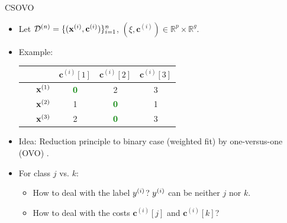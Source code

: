 \documentclass[11pt,compress,t,notes=noshow, xcolor=table]{beamer}
\newcommand{\cv}{\mathbf{c}}
\begin{document}
\begin{frame}{CSOVO}

    \begin{itemize}
        \item Let $\D^{(n)} = \{(\xi, \cv^{(i)})\}_{i=1}^n$, $(\xi, \cv^{(i)}) \in \mathbb{R}^p \times \mathbb{R}^g$.
        \item Example:

        \begin{center}
            \begin{tabular}{cc|ccc}\
        	& & $\cv^{(i)}[1]$ & $\cv^{(i)}[2]$ & $\cv^{(i)}[3]$  \\
        	\hline & $\mathbf{x}^{(1)}$ & \textcolor{green}{\textbf{0}} & 2 & 3\\
        	& $\mathbf{x}^{(2)}$ & 1 & \textcolor{green}{\textbf{0}} & 1\\
                 & $\mathbf{x}^{(3)}$ & 2 & \textcolor{green}{\textbf{0}} & 3\\
            \end{tabular}
        \end{center}
        
        
        \item Idea: Reduction principle to binary case (weighted fit) by one-versus-one (OVO) . 
        
        
        \item For class $j$ vs. $k$:
        \begin{itemize}
            \item How to deal with the label $y^{(i)}$? $y^{(i)}$ can be neither $j$ nor $k$.
            \vspace{5pt}
            
            \item How to deal with the costs $\cv^{(i)}[j]$ and $\cv^{(i)}[k]$?
            
        \end{itemize}
            
    \end{itemize}

\end{frame}
\end{document}
